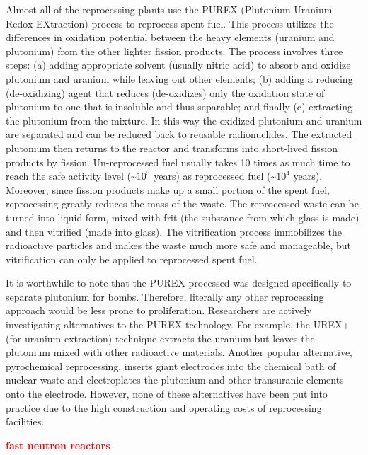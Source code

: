 \documentclass[nofootinbib,preprint,aip,pra]{revtex4-1}
\newcommand{\red}[1]{\textcolor{red}{\bf #1}}
\begin{document}
    Almost all of the reprocessing plants use the PUREX (Plutonium Uranium Redox EXtraction) process
    to reprocess spent fuel. This process utilizes the differences in oxidation potential 
    between the heavy elements (uranium and plutonium) from the other lighter fission products.
    The process involves three steps: (a) adding appropriate solvent (usually nitric acid) to absorb and oxidize 
    plutonium and uranium while leaving out other elements;
    (b) adding a reducing (de-oxidizing) agent that reduces (de-oxidizes) only the
    oxidation state of plutonium to one that is insoluble
    and thus separable; and finally (c) extracting the plutonium from the mixture. In this way
    the oxidized plutonium and uranium are separated and can be reduced back to reusable radionuclides.\cite{lb01} 
    The extracted plutonium then returns to the reactor and transforms into short-lived fission products
    by fission. Un-reprocessed fuel usually takes 10 times as much time to reach the safe
    activity level (\sim$10^5$ years) as reprocessed fuel (\sim$10^4$ years). Moreover, since fission products
    make up a small portion of the spent fuel, reprocessing greatly reduces the mass of the waste. The reprocessed
    waste can be turned into liquid form, mixed with frit (the substance from which glass is made) and then
    vitrified (made into glass). The vitrification process immobilizes the radioactive particles and makes
    the waste much more safe and manageable, but vitrification can only be applied to reprocessed spent fuel.

    It is worthwhile to note that the PUREX processed was designed specifically to separate plutonium for
    bombs. Therefore, literally any other reprocessing approach would be less prone to proliferation.
    Researchers are actively investigating alternatives to the PUREX technology. For example, the UREX+ (for
    uranium extraction) technique extracts the uranium but leaves the plutonium mixed with other
    radioactive materials. Another popular alternative, pyrochemical reprocessing, inserts giant electrodes
    into the chemical bath of nuclear waste and electroplates the plutonium and other transuranic elements onto
    the electrode. However, none of these alternatives have been put into practice due to the high construction
    and operating costs of reprocessing facilities.\cite{aa12}

    \red{fast neutron reactors}
\end{document}
